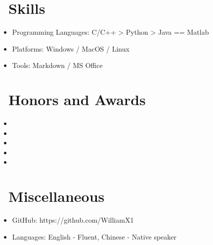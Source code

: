 \documentclass{resume}
\begin{document}
\section{\faCogs\ Skills}
\begin{itemize}[parsep=0.5ex]
  \item Programming Languages: C/C++ > Python > Java == Matlab
  \item Platforms: Windows / MacOS / Linux
  \item Tools: Markdown / MS Office
\end{itemize}

\section{\faHeartO\ Honors and Awards}
\begin{itemize}
    \item {}
    \item {}
    \item {}
    \item {}
    \item {}
\end{itemize}


\section{\faInfo\ Miscellaneous}
\begin{itemize}[parsep=0.5ex]
  \item GitHub: https://github.com/WilliamX1
  \item Languages: English - Fluent, Chinese - Native speaker
\end{itemize}

%
%
\end{document}
